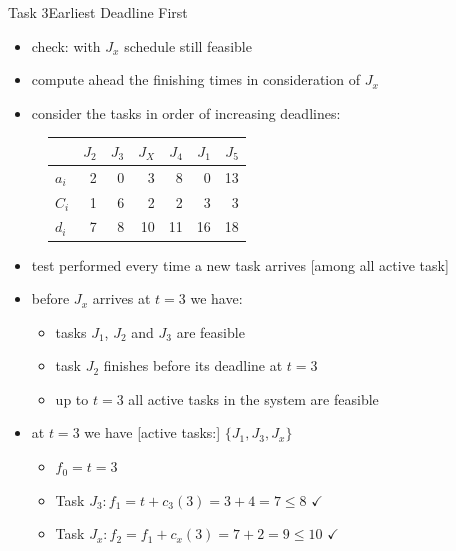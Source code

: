\begin{frame}[allowframebreaks]{Task 3}{Earliest Deadline First}
  \begin{itemize}
    \item \alert{check:} with $J_x$ schedule \alert{still feasible}
    \item compute \alert{ahead} the \alert{finishing times} in consideration of $J_x$
    \item consider the tasks \alert{in order of increasing deadlines:}
  \end{itemize}
  \begin{figure}
  \centering
  \begin{tabular}{|l|r|r|r|r|r|r|}
    \hline             & $J_2$ & $J_3$ & $J_X$ & $J_4$ & $J_1$ & $J_5$ \\
    \hline \hline$a_i$ & 2     & 0     & 3     & 8     & 0     & 13 \\
    \hline$C_i$        & 1     & 6     & 2     & 2     & 3     & 3 \\
    \hline$d_i$        & 7     & 8     & 10    & 11    & 16    & 18 \\
    \hline
  \end{tabular}
  \end{figure}
  \begin{itemize}
    \item test performed every time a new \alert{task arrives} [among \alert{all active task}]
    \item \alert{before} $J_x$ arrives at $t=3$ we have:
    \begin{itemize}
      \item tasks $J_1$, $J_2$ and $J_3$ are feasible
      \item task $J_2$ finishes \alert{before} its \alert{deadline} at $t = 3$
      \item \alert{up to} $t = 3$ \alert{all} active tasks in the system are \alert{feasible}
    \end{itemize}
  \item at $t = 3$ we have [active tasks:] $\{J_1, J_3, J_x\}$
    \begin{itemize}
      \item $f_0=t=3$
      \item Task $J_3: f_1=t+c_3(3)=3+4=7 \leq 8$ $\checkmark$
      \item Task $J_x: f_2=f_1+c_x(3)=7+2=9 \leq 10$ $\checkmark$

\end{itemize}
\end{itemize}
\end{frame}
